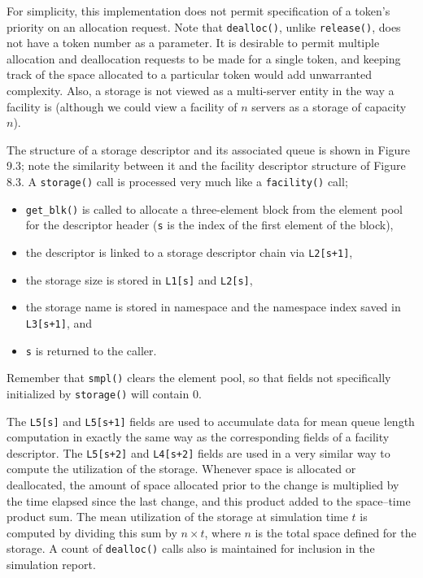 For simplicity, this implementation does not permit specification of a
token's priority on an allocation request. Note that \texttt{dealloc()}, unlike
\texttt{release()}, does not have a token number as a parameter. It is desirable to
permit multiple allocation and deallocation requests to be made for a single
token, and keeping track of the space allocated to a particular token would
add unwarranted complexity. Also, a storage is not viewed as a multi-server
entity in the way a facility is (although we could view a facility of $n$ servers
as a storage of capacity $n$).

The structure of a storage descriptor and its associated queue is shown in
Figure 9.3; note the similarity between it and the facility descriptor structure
of Figure 8.3. A \texttt{storage()} call is processed very much like a
\texttt{facility()} call;
\begin{itemize}
\item \texttt{get\_blk()} is called to allocate a three-element block
from the element pool for the descriptor header (\texttt{s} is the
index of the first element of the block),
\item the descriptor is linked to a storage descriptor chain via
\texttt{L2[s+1]},
\item the storage size is stored in \texttt{L1[s]} and \texttt{L2[s]},
\item the storage name is stored in namespace and the namespace index saved in \texttt{L3[s+1]}, and
\item \texttt{s} is returned to the caller.
\end{itemize}
Remember that \texttt{smpl()} clears the element pool, so that fields not
specifically initialized by \texttt{storage()} will contain 0.

The \texttt{L5[s]} and \texttt{L5[s+1]} fields are used to accumulate data for mean
queue length computation in exactly the same way as the corresponding
fields of a facility descriptor. The \texttt{L5[s+2]} and \texttt{L4[s+2]} fields are used in a
very similar way to compute the utilization of the storage. Whenever space
is allocated or deallocated, the amount of space allocated prior to the
change is multiplied by the time elapsed since the last change, and this
product added to the space--time product sum. The mean utilization of the
storage at simulation time $t$ is computed by dividing this sum by $n\times t$, where
$n$ is the total space defined for the storage. A count of \texttt{dealloc()} calls also
is maintained for inclusion in the simulation report.

